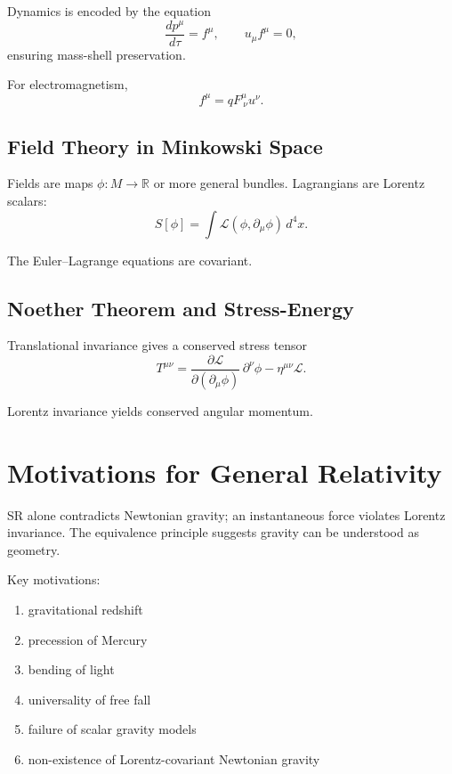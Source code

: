 \documentclass[12pt]{article}
\begin{document}
Dynamics is encoded by the equation
\[
\frac{dp^\mu}{d\tau} = f^\mu,
\qquad
u_\mu f^\mu = 0,
\]
ensuring mass-shell preservation.

For electromagnetism,
\[
f^\mu = q F^\mu_{\ \nu}u^\nu.
\]

\subsection{Field Theory in Minkowski Space}

Fields are maps $\phi:M\to\mathbb{R}$ or more general bundles.  
Lagrangians are Lorentz scalars:
\[
S[\phi] = \int \mathcal{L}(\phi,\partial_\mu\phi)\, d^4x.
\]

The Euler--Lagrange equations are covariant.

\subsection{Noether Theorem and Stress-Energy}

Translational invariance gives a conserved stress tensor
\[
T^{\mu\nu}
= \frac{\partial\mathcal{L}}{\partial(\partial_\mu\phi)}
\,\partial^\nu\phi
- \eta^{\mu\nu}\mathcal{L}.
\]

Lorentz invariance yields conserved angular momentum.

\section{Motivations for General Relativity}

SR alone contradicts Newtonian gravity; an instantaneous force violates 
Lorentz invariance. The equivalence principle suggests gravity can be 
understood as geometry.

Key motivations:
\begin{enumerate}
\item gravitational redshift 
\item precession of Mercury 
\item bending of light 
\item universality of free fall 
\item failure of scalar gravity models 
\item non-existence of Lorentz-covariant Newtonian gravity 
\end{enumerate}

\end{document}

